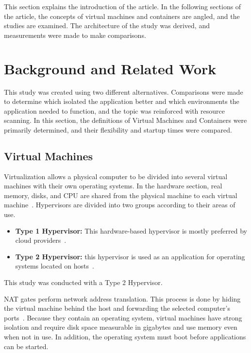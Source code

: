 \documentclass[conference,a4paper]{IEEEtran}
\begin{document}
This section explains the introduction of the article. In the following sections of the article, the concepts of virtual machines and containers are angled, and the studies are examined. The architecture of the study was derived, and measurements were made to make comparisons.

\section{Background and Related Work}
\label{sec:related_work}

This study was created using two different alternatives. Comparisons were made to determine which isolated the application better and which environments the application needed to function, and the topic was reinforced with resource scanning. In this section, the definitions of Virtual Machines and Containers were primarily determined, and their flexibility and startup times were compared.

\subsection{Virtual Machines}
Virtualization allows a physical computer to be divided into several virtual machines with their own operating systems. In the hardware section, real memory, disks, and CPU are shared from the physical machine to each virtual machine~\cite{b2}. Hypervisors are divided into two groups according to their areas of use.
\begin{itemize}
	\item \textbf{Type 1 Hypervisor:} This hardware-based hypervisor is mostly preferred by cloud providers~\cite{b2}.
	\item \textbf{Type 2 Hypervisor:} this hypervisor is used as an application for operating systems located on hosts~\cite{b2}.
\end{itemize}
This study was conducted with a Type 2 Hypervisor.

NAT gates perform network address translation. This process is done by hiding the virtual machine behind the host and forwarding the selected computer's ports~\cite{b4}. Because they contain an operating system, virtual machines have strong isolation and require disk space measurable in gigabytes and use memory even when not in use. In addition, the operating system must boot before applications can be started.
\end{document}
